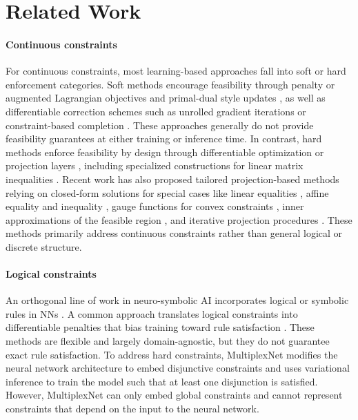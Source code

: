 \documentclass{article}
\theoremstyle{plain}
\theoremstyle{definition}
\theoremstyle{remark}
\begin{document}
\section{Related Work}

\paragraph{Continuous constraints}
For continuous constraints, most learning-based approaches fall into soft or hard enforcement categories. Soft methods encourage feasibility through penalty or augmented Lagrangian objectives and primal-dual style updates \cite{fioretto2020lagrangiandualityconstraineddeep, park2022selfsupervisedprimalduallearningconstrained}, as well as differentiable correction schemes such as unrolled gradient iterations or constraint-based completion \cite{Donti2021}. These approaches generally do not provide feasibility guarantees at either training or inference time. In contrast, hard methods enforce feasibility by design through differentiable optimization or projection layers \cite{Amos2017,agrawal2019differentiable}, including specialized constructions for linear matrix inequalities \cite{Tang2026LMINetLM}. Recent work has also proposed tailored projection-based methods relying on closed-form solutions for special cases like linear equalities \cite{Chen2024}, affine equality and inequality \cite{min2024hardnet}, gauge functions for convex constraints \cite{ constanteflores2025enforcinghardlinearconstraints, Tabas2022b, Liang2024, Tordesillas2023}, inner approximations of the feasible region \cite{Frerix2020, Zheng2021}, and iterative projection procedures \cite{lastrucci2025enforce, iftakher2025physics,nguyen2025fsnet}. These methods primarily address continuous constraints rather than general logical or discrete structure.

\paragraph{Logical constraints}
An orthogonal line of work in neuro-symbolic AI incorporates logical or symbolic rules in NNs \cite{Giunchiglia_2022}. A common approach translates logical constraints into differentiable penalties that bias training toward rule satisfaction \cite{xu2018semantic, hu2020harnessingdeepneuralnetworks, pmlr-v97-fischer19a, Badreddine_2022, manhaeve2018deepproblog}. These methods are flexible and largely domain-agnostic, but they do not guarantee exact rule satisfaction. To address hard constraints, MultiplexNet \cite{hoernle2022multiplexnet} modifies the neural network architecture to embed disjunctive constraints and uses variational inference to train the model such that at least one disjunction is satisfied. However, MultiplexNet can only embed global constraints and cannot represent constraints that depend on the input to the neural network. 
\end{document}
